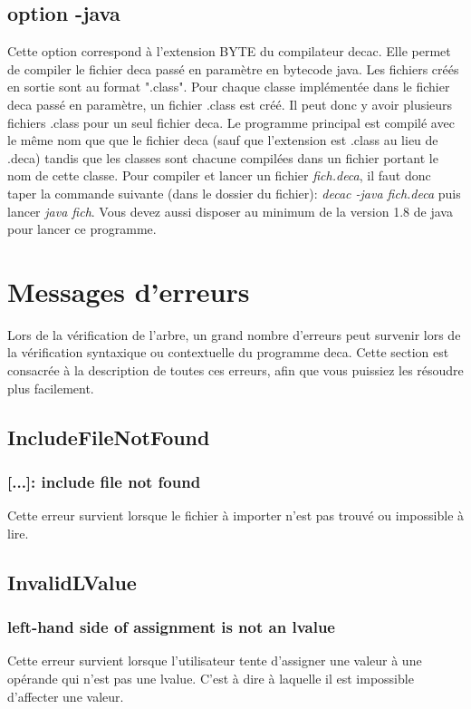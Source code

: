 \documentclass[12pt, a4paper, one side]{article}
\begin{document}
    \subsection{option -java}

    Cette option correspond à l'extension BYTE du compilateur decac. Elle permet de compiler le fichier deca passé en paramètre en bytecode java. Les fichiers créés en sortie sont au format ".class". Pour chaque classe implémentée dans le fichier deca passé en paramètre, un fichier .class est créé. Il peut donc y avoir plusieurs fichiers .class pour un seul fichier deca. Le programme principal est compilé avec le même nom que que le fichier deca (sauf que l'extension est .class au lieu de .deca) tandis que les classes sont chacune
    compilées dans un fichier portant le nom de cette classe.
    Pour compiler et lancer un fichier \textit{fich.deca}, il faut donc taper la commande suivante (dans le dossier du fichier): \textit{decac -java fich.deca} puis lancer \textit{java fich}.
    Vous devez aussi disposer au minimum de la version 1.8 de java pour lancer ce programme.

    \section{Messages d'erreurs}

    Lors de la vérification de l'arbre, un grand nombre d'erreurs peut survenir lors de la vérification syntaxique ou
    contextuelle du programme deca. Cette section est consacrée à la description de toutes ces erreurs,
    afin que vous puissiez les résoudre plus facilement.

    \subsection{IncludeFileNotFound}
    \subsubsection{[...]: include file not found}
    Cette erreur survient lorsque le fichier à importer n'est pas trouvé ou impossible à lire.


    \subsection{InvalidLValue}
    \subsubsection{left-hand side of assignment is not an lvalue}
    Cette erreur survient lorsque l'utilisateur tente d'assigner une valeur à une opérande qui n'est pas une lvalue. C'est à dire à laquelle il est impossible d'affecter une valeur.
\end{document}
